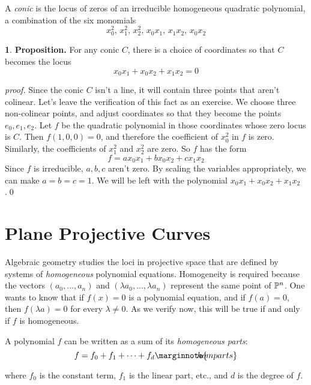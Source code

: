 \documentclass[leqno]{book}
\newcommand\Marginnote[1]{\marginnote{\hspace{-12pt}\normalfont{#1}}}
\theoremstyle{definition}%
\numberwithin{equation}{section}
\theoremstyle{theorem} %
\newtheorem{proposition}[equation]{}
\renewenvironment{proof}{\no \emph{proof.}}{}
\begin{document}
A {\it conic} is the locus of zeros of an irreducible homogeneous
quadratic polynomial, a
combination of the six monomials $$x_0^2,\, x_1^2,\, x_2^2,\,
x_0x_1,\, x_1x_2,\, x_0x_2$$


\begin{proposition}{\bf Proposition.} 
\Marginnote{classifyconic}\label{classifyconic} For any conic $C$,
there is a choice of coordinates so that $C$ becomes the locus
$$x_0x_1+x_0x_2+x_1x_2 = 0$$
\end{proposition}

\begin{proof} 
Since the conic $C$ isn't a line, it will contain three points that
aren't colinear.  Let's leave the verification of this fact as an
exercise.  We choose three non-colinear points, and adjust coordinates
so that they become the points $e_0,e_1,e_2$.  Let $f$ be the
quadratic polynomial in those coordinates whose zero locus is
$C$. Then $f(1,0,0) = 0$, and therefore the coefficient of $x_0^2$ in
$f$ is zero.  Similarly, the coefficients of $x_1^2$ and $x_2^2$ are
zero.  So $f$ has the form $$f = ax_0x_1+bx_0x_2+cx_1x_2$$Since $f$ is
irreducible, $a,b,c$ aren't zero.  By scaling the variables
appropriately, we can make $a=b=c=1$.  We will be left with the
polynomial $x_0x_1+x_0x_2+x_1x_2$.\qed\end{proof}

\section{Plane  Projective Curves} 
\label{projcurve}\Marginnote{projcurve}

\msno Algebraic geometry studies the loci in projective space that are
defined by systems of {\it homogeneous} polynomial equations.
Homogeneity is required because the vectors $(a_0,...,a_n)$ and
$(\lambda a_0,...,\lambda a_n)$ represent the same point of $\mathbb{P}^n$.
One wants to know that if $f(x)=0$ is a polynomial equation, and if
$f(a)=0$, then $f(\lambda a) = 0$ for every $\lambda \neq 0$.  As we
verify now,  this will be true if and only if $f$ is homogeneous.

A polynomial $f$ can be written as a sum of its {\it homogeneous
  parts}:
\begin{equation}
f = f_0+f_1+ \cdots + f_d \Marginnote{homparts}
	\label{homparts}
\end{equation}

\no
where $f_0$ is the constant term,  $f_1$ is the linear part, etc., and
$d$ is the degree of $f$.
\end{document}

